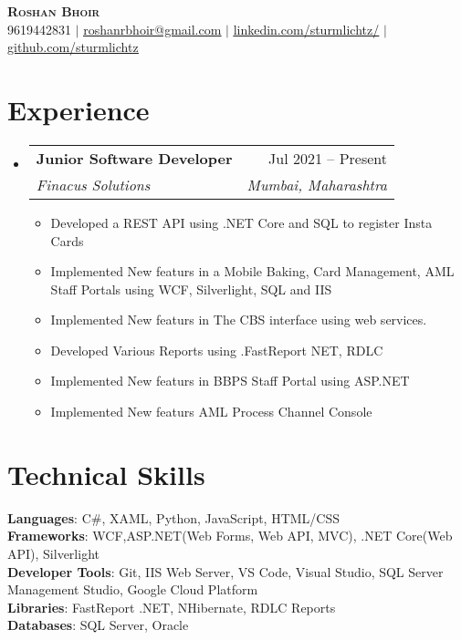 \documentclass[letterpaper,11pt]{article}
\makeatletter
\newcommand{\resumeItem}[1]{
  \item\small{
    {#1 \vspace{-2pt}}
  }
}
\newcommand{\resumeSubheading}[4]{
  \vspace{-2pt}\item
    \begin{tabular*}{0.97\textwidth}[t]{l@{\extracolsep{\fill}}r}
      \textbf{#1} & #2 \\
      \textit{\small#3} & \textit{\small #4} \\
    \end{tabular*}\vspace{-7pt}
}
\newcommand{\resumeSubHeadingListStart}{\begin{itemize}[leftmargin=0.15in, label={}]}
\newcommand{\resumeSubHeadingListEnd}{\end{itemize}}
\newcommand{\resumeItemListStart}{\begin{itemize}}
\newcommand{\resumeItemListEnd}{\end{itemize}\vspace{-5pt}}
\makeatother
\begin{document}
\begin{center}
    \textbf{\Huge \scshape Roshan Bhoir} \\ \vspace{1pt}
    \small 9619442831 $|$ \href{mailto:x@x.com}{\underline{roshanrbhoir@gmail.com}} $|$ 
    \href{https://linkedin.com/in/sturmlichtz}{\underline{linkedin.com/sturmlichtz/}} $|$
    \href{https://github.com/sturmlichtz}{\underline{github.com/sturmlichtz}}
\end{center}

\section{Experience}
  \resumeSubHeadingListStart
    \resumeSubheading
      {Junior Software Developer}{Jul 2021 -- Present}
      {Finacus Solutions}{Mumbai, Maharashtra}
      \resumeItemListStart
        \resumeItem{Developed a REST API using .NET Core and SQL to register Insta Cards}
        \resumeItem{Implemented New featurs in a Mobile Baking, Card Management, AML Staff Portals using WCF, Silverlight, SQL and IIS}
        \resumeItem{Implemented New featurs in The CBS interface using web services. }
        \resumeItem{Developed Various Reports using .FastReport NET, RDLC}
        \resumeItem{Implemented New featurs in BBPS Staff Portal using ASP.NET }
        \resumeItem{Implemented New featurs AML Process Channel Console }
      \resumeItemListEnd
  \resumeSubHeadingListEnd

\section{Technical Skills}
 \begin{itemize}[leftmargin=0.15in, label={}]
    \small{\item{
     \textbf{Languages}{: C\#, XAML, Python, JavaScript, HTML/CSS} \\
     \textbf{Frameworks}{: WCF,ASP.NET(Web Forms, Web API, MVC), .NET Core(Web API), Silverlight} \\
     \textbf{Developer Tools}{: Git, IIS Web Server, VS Code, Visual Studio, SQL Server Management Studio, Google Cloud Platform} \\
     \textbf{Libraries}{: FastReport .NET, NHibernate, RDLC Reports}\\
     \textbf{Databases}{: SQL Server, Oracle} \\
    }}
 \end{itemize}
\end{document}
